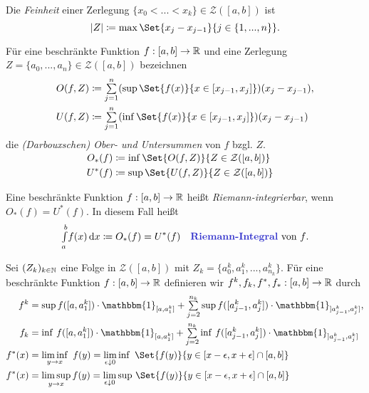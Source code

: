 \documentclass{cheat-sheet}
\newcommand{\ind}{\mathbbm{1}} %
\theoremstyle{definition}
\begin{document}
\begin{defn}
  Die \emph{Feinheit} einer Zerlegung $\{ x_0 < ... < x_k \} \in \mathcal{Z}([a, b])$ ist
  \[ \abs{Z} \coloneqq \max \Set{ x_j - x_{j-1} }{ j \in \{ 1, ..., n \} }. \]
\end{defn}

\begin{defn}
  Für eine beschränkte Funktion $f : [a, b] \to \mathbb{R}$ und eine Zerlegung $Z = \{ a_0, ..., a_n \} \in \mathcal{Z}([a, b])$ bezeichnen
  \begin{align*}
    O(f, Z) &\coloneqq \sum_{j=1}^n (\sup \Set{ f(x) }{ x \in [x_{j-1}, x_j] })(x_j - x_{j-1}),\\
    U(f, Z) &\coloneqq \sum_{j=1}^n (\inf \Set{ f(x) }{ x \in [x_{j-1}, x_j] })(x_j - x_{j-1})
  \end{align*}
  die \emph{(Darbouxschen) Ober- und Untersummen} von $f$ bzgl. $Z$.
\end{defn}

\begin{nota}
  \begin{align*}\\[-24pt]
    O_*(f) &\coloneqq \inf \Set{ O(f, Z) }{ Z \in \mathcal{Z}([a, b]) }\\
    U^*(f) &\coloneqq \sup \Set{ U(f, Z) }{ Z \in \mathcal{Z}([a, b]) }\\
  \end{align*}
\end{nota}

\begin{defn}
  Eine beschränkte Funktion $f : [a, b] \to \mathbb{R}$ heißt \emph{Riemann-integrierbar}, wenn $O_*(f) = U^*(f)$. In diesem Fall heißt
  \[ \Int{a}{b}{f(x)}{x} \coloneqq O_*(f) = U^*(f) \quad \text{\emph{Riemann-Integral} von $f$.} \]
\end{defn}

\begin{nota}
  Sei $(Z_k)_{k \in \mathbb{N}}$ eine Folge in $\mathcal{Z}([a, b])$ mit $Z_k = \{ a_0^k, a_1^k, ..., a^k_{n_k} \}$. Für eine beschränkte Funktion $f : [a, b] \to \mathbb{R}$ definieren wir $f^k, f_k, f^*, f_* : [a, b] \to \mathbb{R}$ durch
  \begin{align*}
    f^k &= \sup f([a, a_1^k]) \cdot \ind_{[a, a_1^k]} + \sum_{j=2}^{n_k} \sup f([a_{j-1}^k, a_j^k]) \cdot \ind_{]a_{j-1}^k, a_j^k]},\\
    f_k &= \inf \, f([a, a_1^k]) \cdot \ind_{[a, a_1^k]} + \sum_{j=2}^{n_k} \inf \, f([a_{j-1}^k, a_j^k]) \cdot \ind_{]a_{j-1}^k, a_j^k]}\\
    f^*(x) &= \liminf_{y \to x}\,\, f(y) = \lim_{\epsilon \downarrow 0} \inf\,\, \Set{ f(y) }{ y \in [x-\epsilon, x+\epsilon] \cap [a, b]}\\
    f^*(x) &= \limsup_{y \to x} f(y) = \lim_{\epsilon \downarrow 0} \sup \, \Set{ f(y) }{ y \in [x-\epsilon, x+\epsilon] \cap [a, b]}
  \end{align*}
\end{nota}
\end{document}
